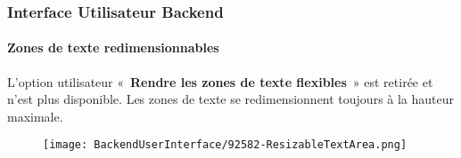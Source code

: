 %

\begin{frame}[fragile]
	\frametitle{Interface Utilisateur Backend}
	\framesubtitle{Zones de texte redimensionnables}

	L'option utilisateur «~\textbf{Rendre les zones de texte flexibles}~» est retirée et n'est plus disponible.
	Les zones de texte se redimensionnent toujours à la hauteur maximale.

	\begin{figure}
		\texttt{[image: BackendUserInterface/92582-ResizableTextArea.png]}
	\end{figure}

\end{frame}

